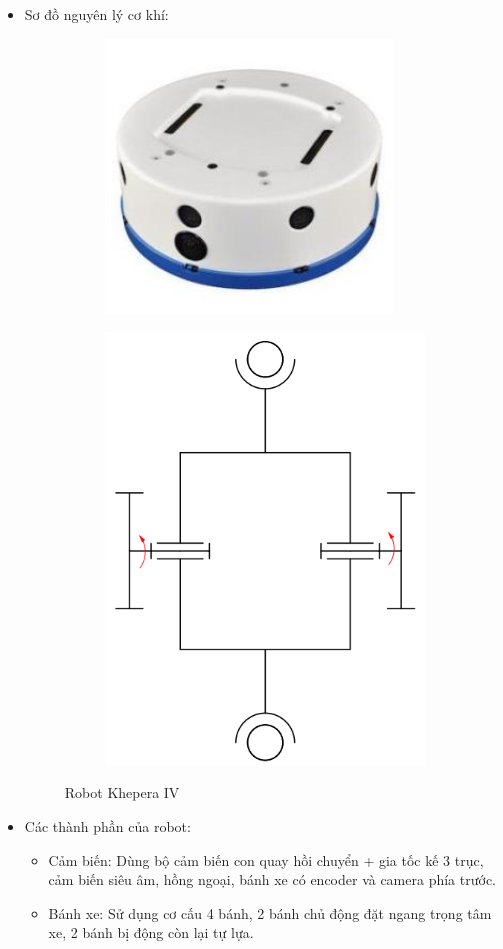         \begin{itemize}
            \item Sơ đồ nguyên lý cơ khí:
            \begin{figure}[H]
                \begin{subfigure}{0.5\textwidth}
                \centering
                \includegraphics[width=0.6\linewidth, right]{pictures/chapter1/chapter1_pic14a_kheperaIV.png} 
                \label{chap1_pic14a}
                \end{subfigure}
                \begin{subfigure}{0.6\textwidth}
                \includegraphics[width=0.5\linewidth]{pictures/chapter1/chapter1_pic14b_kheperaIV.png}
                \label{chap1_pic14b}
                \end{subfigure}
                \caption{Robot Khepera IV}
                \label{chap1_pic14}
            \end{figure}
            \item Các thành phần của robot:
                \begin{itemize}[label=\textendash]
                    \item Cảm biến: Dùng bộ cảm biến con quay hồi chuyển + gia tốc kế 3 trục, cảm biến siêu âm, hồng ngoại, bánh xe có encoder và camera phía trước.
                    \item Bánh xe: Sử dụng cơ cấu 4 bánh, 2 bánh chủ động đặt ngang trọng tâm xe, 2 bánh bị động còn lại tự lựa.
                \end{itemize}
        \end{itemize}

